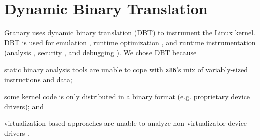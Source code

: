 \documentclass[preprint]{sigplanconf}
\begin{document}

\section{Dynamic Binary Translation}\label{sec:dbt}

Granary uses dynamic binary translation (DBT) to instrument the Linux kernel. DBT is used for emulation \cite{QEMU}, runtime optimization \cite{DynamoRIOOptimization}, and runtime instrumentation (analysis \cite{DynamoRIO, DRK, btkernel, ProfilingSimics}, security \cite{Vx32,NaCl,ProgramShepherding}, and debugging \cite{Valgrind}). We chose DBT because \begin{inparaenum}[i)]
	\item static binary analysis tools are unable to cope with \texttt{x86}'s mix of variably-sized instructions and data; 
	\item some kernel code is only distributed in a binary format (e.g. proprietary device drivers); and
	\item virtualization-based approaches are unable to analyze non-virtualizable device drivers \cite{DRK}.
\end{inparaenum}
\end{document}
